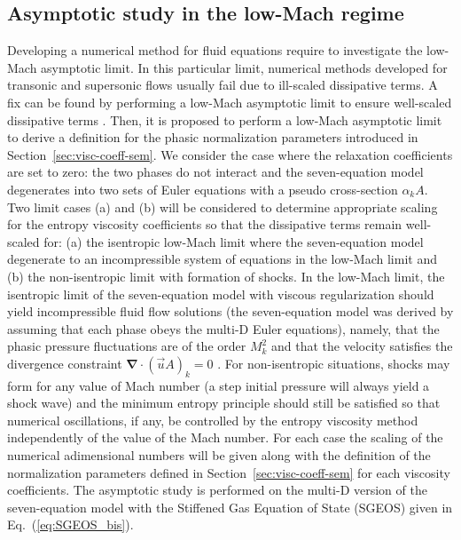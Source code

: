 \documentclass[preprint,10pt]{elsarticle}
\renewcommand{\div}{\mbold{\nabla}\! \cdot \!}
\newcommand{\mbold}[1]{\boldsymbol#1}
\newcommand{\eqt}[1]{Eq.~(\ref{#1})}                     %
\newcommand{\sct}[1]{Section~\ref{#1}}                   %
\begin{document}
\subsection{Asymptotic study in the low-Mach regime}\label{sec:low-Mach-sem}
Developing a numerical method for fluid equations require to investigate the low-Mach asymptotic limit. In this particular limit, numerical methods developed for transonic and supersonic flows usually fail due to ill-scaled dissipative terms. A fix can be found by performing a low-Mach asymptotic limit to ensure well-scaled dissipative terms \cite{LowMach1, LowMach2, LowMach3}. Then, it is proposed to perform a low-Mach asymptotic limit to derive a definition for the phasic normalization parameters introduced in \sct{sec:visc-coeff-sem}. We consider the case where the relaxation coefficients are set to zero:  
the two phases do not interact and the seven-equation model degenerates into two sets of Euler equations with a pseudo cross-section $\alpha_k A$. 
Two limit cases (a) and (b) will be considered to determine appropriate scaling for the entropy 
viscosity coefficients so that the dissipative terms remain well-scaled for: 
(a) the isentropic low-Mach limit where the seven-equation model degenerate to an incompressible system of 
equations in the low-Mach limit and (b) the non-isentropic limit with formation of shocks. 
In the low-Mach limit, the isentropic limit of the seven-equation model with viscous regularization should yield incompressible 
fluid flow solutions (the seven-equation model was derived by assuming that each phase obeys the multi-D Euler equations), namely, that the phasic pressure fluctuations are of the 
order $M^2_k$ and that the velocity satisfies the divergence constraint $\div ( \vec{u} A)_k = 0$ 
\cite{LowMach1, LowMach2, LowMach3}. For non-isentropic situations, shocks may form for any 
value of Mach number (a step initial pressure will always yield a shock wave) and the minimum entropy principle should still be satisfied so that numerical 
oscillations, if any, be controlled by the entropy viscosity method independently of the value of the Mach number. For each case the scaling of the numerical adimensional numbers will be given along with the definition of the normalization parameters defined in \sct{sec:visc-coeff-sem} for each viscosity coefficients. The asymptotic study is performed on the multi-D version of the seven-equation model with the Stiffened Gas Equation of State (SGEOS) given in \eqt{eq:SGEOS_bis}.
\end{document}
